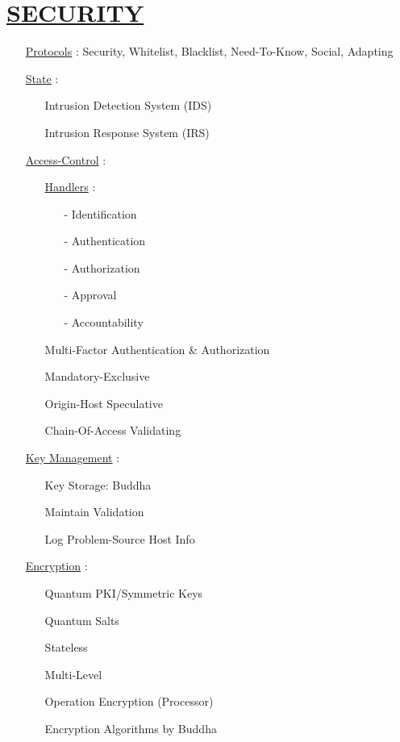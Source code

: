 \documentclass[11pt]{article}
\begin{document}
\section*{\ul{SECURITY}}
\begin{enumerate}
	\item[] \ul{Protocols} : Security, Whitelist, Blacklist, Need-To-Know, Social, Adapting
	
	\item[] \ul{State} :
	\begin{enumerate}
		\item[] Intrusion Detection System (IDS)
		\item[] Intrusion Response System (IRS)
	\end{enumerate}
	
	\item[] \ul{Access-Control} :
	\begin{enumerate}
		\item[] \ul{Handlers} :
		\begin{enumerate}
			\item[-] Identification
			\item[-] Authentication
			\item[-] Authorization
			\item[-] Approval
			\item[-] Accountability
		\end{enumerate}
	
		\item[] Multi-Factor Authentication \& Authorization
		\item[] Mandatory-Exclusive
		\item[] Origin-Host Speculative
		\item[] Chain-Of-Access Validating
	\end{enumerate}

	\item[] \ul{Key Management} :
	\begin{enumerate}
		\item[] Key Storage: Buddha
		\item[] Maintain Validation
		\item[] Log Problem-Source Host Info
	\end{enumerate}
	
	\item[] \ul{Encryption} :
	\begin{enumerate}
		\item[] Quantum PKI/Symmetric Keys
		\item[] Quantum Salts
		\item[] Stateless
		\item[] Multi-Level
		\item[] Operation Encryption (Processor)
		\item[] Encryption Algorithms by Buddha %
	\end{enumerate}
	

\end{enumerate}
\end{document}
